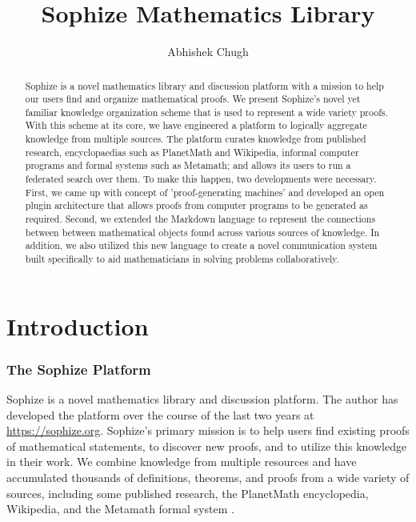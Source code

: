 \documentclass[a4paper]{article}
\title{Sophize Mathematics Library}
\author{ Abhishek Chugh }
\begin{document}
\maketitle

\begin{abstract}
Sophize is a novel mathematics library and discussion platform with a mission to help our users find and organize mathematical proofs. We present Sophize's novel yet familiar knowledge organization scheme that is used to represent a wide variety proofs. With this scheme at its core, we have engineered a platform to logically aggregate knowledge from multiple sources. The platform curates knowledge from published research, encyclopaedias such as PlanetMath and Wikipedia, informal computer programs and formal systems such as Metamath; and allows its users to run a federated search over them. To make this happen, two developments were necessary. First, we came up with concept of 'proof-generating machines' and developed an open plugin architecture that allows proofs from computer programs to be generated as required. Second, we extended the Markdown language to represent the connections between between mathematical objects found across various sources of knowledge. In addition, we also utilized this new language to create a novel communication system built specifically to aid mathematicians in solving problems collaboratively.

\end{abstract}

\vskip 32pt

\section{Introduction}

\subsubsection*{The Sophize Platform}


Sophize is a novel mathematics library and discussion platform. The author has developed the platform over the course of the last two years at \url{https://sophize.org}. Sophize's primary mission is to help users find existing proofs of mathematical statements, to discover new proofs, and to utilize this knowledge in their work. We combine knowledge from multiple resources and have accumulated thousands of definitions, theorems, and proofs from a wide variety of sources, including some published research, the PlanetMath encyclopedia, Wikipedia, and the Metamath formal system \cite{metamath}.
\end{document}
